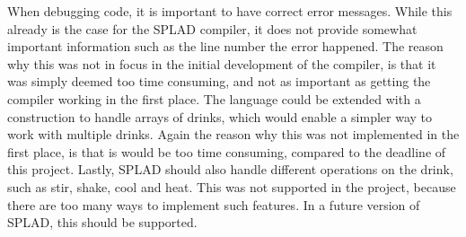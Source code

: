 When debugging code, it is important to have correct error messages. While this already is the case for the SPLAD compiler, it does not provide somewhat important information such as the line number the error happened. The reason why this was not in focus in the initial development of the compiler, is that it was simply deemed too time consuming, and not as important as getting the compiler working in the first place. The language could be extended with a construction to handle arrays of drinks, which would enable a simpler way to work with multiple drinks. Again the reason why this was not implemented in the first place, is that is would be too time consuming, compared to the deadline of this project.
Lastly, SPLAD should also handle different operations on the drink, such as stir, shake, cool and heat. This was not supported in the project, because there are too many ways to implement such features. In a future version of SPLAD, this should be supported.
